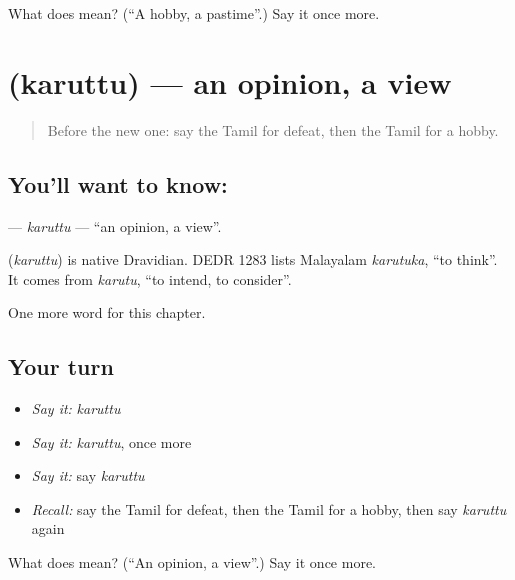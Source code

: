 \begin{tcolorbox}[breakable,colback=teal!4,colframe=teal!35!black,title={Before you move on}]
What does  mean? (\textquotedblleft{}A hobby, a pastime\textquotedblright{}.) Say it once more.
\end{tcolorbox}
\section[\texorpdfstring{\ta{கருத்து} (karuttu)}{கருத்து (karuttu)}]{ (karuttu) — an opinion, a view}

\label{lesson:TA-C277-karuttu}



\begin{quote}
Before the new one: say the Tamil for defeat, then the Tamil for a hobby.
\end{quote}

\subsection*{You'll want to know: }
\textbf{} — \emph{karuttu} — \textquotedblleft{}an opinion, a view\textquotedblright{}.

\begin{cousinweb}
\textbf{} (\emph{karuttu}) is native Dravidian. DEDR 1283 lists Malayalam \emph{karutuka}, \textquotedblleft{}to think\textquotedblright{}. It comes from \emph{karutu}, \textquotedblleft{}to intend, to consider\textquotedblright{}.
\end{cousinweb}

\begin{grammarlens}[title={What you've built}]
One more word for this chapter.
\end{grammarlens}

\subsection*{Your turn}
\begin{itemize}
\raggedright
  \item \emph{Say it:} \emph{karuttu}
  \item \emph{Say it:} \emph{karuttu}, once more
  \item \emph{Say it:} say \emph{karuttu}
  \item \emph{Recall:} say the Tamil for defeat, then the Tamil for a hobby, then say \emph{karuttu} again
\end{itemize}

\begin{tcolorbox}[breakable,colback=teal!4,colframe=teal!35!black,title={Before you move on}]
What does  mean? (\textquotedblleft{}An opinion, a view\textquotedblright{}.) Say it once more.
\end{tcolorbox}

